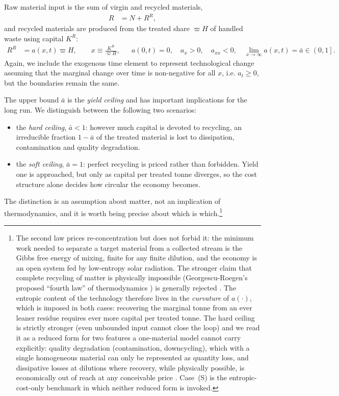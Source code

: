  Raw material input is the sum of virgin and recycled materials,
\begin{align}
R &= N + R^R,
\label{eq:sp:setup:materials}
\end{align}
and recycled materials are produced from the treated share $\varpi H$ of handled waste using capital $K^R$:
\begin{align}
R^R &= a\!\left(x,t\right)\varpi H,
\qquad
x\equiv\frac{K^R}{\varpi H},
&&
a(0,t)=0,\quad a_x>0,\quad a_{xx}<0,\quad
\lim_{x\to\infty}a(x,t)=\bar a\in\left(0,1\right].
\label{eq:sp:setup:recycling}
\end{align}
Again, we include the exogenous time element to represent technological change assuming that the marginal change over time is non-negative for all $x$, i.e. $a_t\geq0$, but the boundaries remain the same.

The upper bound $\bar{a}$ is the \emph{yield ceiling} and has important implications for the long run. We distinguish between the following two scenarios:
\begin{itemize}
\item[(H)] the \emph{hard ceiling}, $\bar a<1$: however much capital is devoted to recycling, an irreducible fraction $1-\bar a$ of the treated material is lost to dissipation, contamination and quality degradation. 
\item[(S)] the \emph{soft ceiling}, $\bar a=1$: perfect recycling is priced rather than forbidden. Yield one is approached, but only as capital per treated tonne diverges, so the cost structure alone decides how circular the economy becomes.
\end{itemize}
The distinction is an assumption about matter, not an implication of thermodynamics, and it is worth being precise about which is which.\footnote{The second law prices re-concentration but does not forbid it: the minimum work needed to separate a target material from a collected stream is the Gibbs free energy of mixing, finite for any finite dilution, and the economy is an open system fed by low-entropy solar radiation. The stronger claim that complete recycling of matter is physically impossible (Georgescu-Roegen's proposed ``fourth law'' of thermodynamics \parencite{georgescu1971,georgescu1977}) is generally rejected \parencite{bianciardi1993,ayres1999}. The entropic content of the technology therefore lives in the \emph{curvature} of $a\left(\cdot\right)$, which is imposed in both cases: recovering the marginal tonne from an ever leaner residue requires ever more capital per treated tonne. The hard ceiling is strictly stronger (even unbounded input cannot close the loop) and we read it as a reduced form for two features a one-material model cannot carry explicitly: quality degradation (contamination, downcycling), which with a single homogeneous material can only be represented as quantity loss, and dissipative losses at dilutions where recovery, while physically possible, is economically out of reach at any conceivable price \parencite{reck2012,cullen2017}. Case~(S) is the entropic-cost-only benchmark in which neither reduced form is invoked.} 



